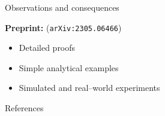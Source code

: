 

\begin{frame}{Observations and consequences}


\begin{minipage}{0.48\textwidth}
    \ElectionData{}
\end{minipage}
\begin{minipage}{0.48\textwidth}
    \ElectionResultsGlobal{}
\end{minipage}



\pause
\begin{minipage}{0.8\textwidth}
\textbf{Preprint: }\citet{giordano:2023:bayesij}  (\texttt{arXiv:2305.06466})
%
\begin{itemize}
\item Detailed proofs
\item Simple analytical examples
\item Simulated and real--world experiments
\end{itemize}
%
\end{minipage}
\begin{minipage}{0.15\textwidth}
\end{minipage}
    
\end{frame}




\begin{frame}{References}

\footnotesize


\begingroup
\renewcommand{\section}[2]{}%

\endgroup

%
\end{frame}
